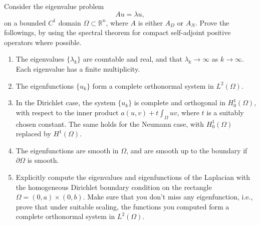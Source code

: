 \documentclass[11pt,reqno]{amsart}
\newcommand{\R}{\mathbb{R}}
\begin{document}
\begin{enumerate}[1.]
\begin{itemize}
\end{itemize}
Consider the eigenvalue problem
$$
A u = \lambda u,
$$
on a bounded $C^1$ domain $\Omega\subset\R^n$, 
where $A$ is either $A_D$ or $A_N$.
Prove the followings, by using the spectral theorem for compact self-adjoint positive operators where possible.
\begin{enumerate}
\item
The eigenvalues $\{\lambda_k\}$ are countable and real, and that $\lambda_k\to\infty$ as $k\to\infty$.
Each eigenvalue has a finite multiplicity.
\item
The eigenfunctions $\{u_k\}$ form a complete orthonormal system in $L^2(\Omega)$.
\item
In the Dirichlet case, the system $\{u_k\}$ is complete and orthogonal in $H^1_0(\Omega)$, with respect to the inner product $a(u,v)+t\int_\Omega uv$, where $t$ is a suitably chosen constant.
The same holds for the Neumann case, with $H^1_0(\Omega)$ replaced by $H^1(\Omega)$.
\item
The eigenfunctions are smooth in $\Omega$, and are smooth up to the boundary if $\partial\Omega$ is smooth.
\item
Explicitly compute the eigenvalues and eigenfunctions 
of the Laplacian with the homogeneous Dirichlet boundary condition
on the rectangle $\Omega=(0,a)\times(0,b)$.
Make sure that you don't miss any eigenfunction, i.e.,
prove that under suitable scaling, the functions you computed form a complete orthonormal system in $L^2(\Omega)$.
\end{enumerate}
\end{enumerate}
\end{document}
